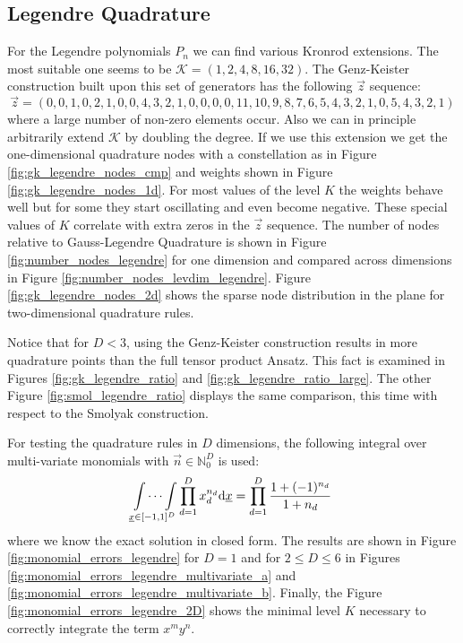 \documentclass[a4paper,10pt]{article}
\begin{document}

\subsection{Legendre Quadrature}

For the Legendre polynomials $P_n$ we can find various Kronrod extensions. The
most suitable one seems to be $\mathcal{K} = (1,2,4,8,16,32)$. The Genz-Keister
construction built upon this set of generators has the following $\vec{z}$
sequence:
\begin{equation*}
  \vec{z} = (0, 0, 1, 0, 2, 1, 0, 0, 4, 3, 2, 1, 0, 0, 0, 0, 11, 10, 9, 8, 7, 6, 5, 4, 3, 2, 1, 0, 5, 4, 3, 2, 1)
\end{equation*}
where a large number of non-zero elements occur. Also we can in principle
arbitrarily extend $\mathcal{K}$ by doubling the degree. If we use this
extension we get the one-dimensional quadrature nodes with a constellation
as in Figure \ref{fig:gk_legendre_nodes_cmp} and weights shown in Figure
\ref{fig:gk_legendre_nodes_1d}. For most values of the level $K$ the weights
behave well but for some they start oscillating and even become negative.
These special values of $K$ correlate with extra zeros in the $\vec{z}$ sequence.
The number of nodes relative to Gauss-Legendre Quadrature is shown
in Figure \ref{fig:number_nodes_legendre} for one dimension and
compared across dimensions in Figure \ref{fig:number_nodes_levdim_legendre}.
Figure \ref{fig:gk_legendre_nodes_2d} shows the sparse node distribution
in the plane for two-dimensional quadrature rules.

Notice that for $D < 3$, using the Genz-Keister construction results
in more quadrature points than the full tensor product Ansatz. This
fact is examined in Figures \ref{fig:gk_legendre_ratio} and \ref{fig:gk_legendre_ratio_large}.
The other Figure \ref{fig:smol_legendre_ratio} displays the same comparison,
this time with respect to the Smolyak construction.

For testing the quadrature rules in $D$ dimensions, the following integral
over multi-variate monomials with $\vec{n} \in \mathbb{N}_0^D$ is used:
\begin{equation} \label{eq:legendre_exact_solution}
  \idotsint \limits_{\underline{x} \in [-1,1]^D} \prod_{d=1}^D x_d^{n_d} \mathrm{d}\underline{x}
  =
  \prod_{d=1}^D \frac{1 + (-1)^{n_d}}{1 + n_d}
\end{equation}
where we know the exact solution in closed form. The results are shown in
Figure \ref{fig:monomial_errors_legendre} for $D=1$ and for $2 \leq D \leq 6$
in Figures \ref{fig:monomial_errors_legendre_multivariate_a} and
\ref{fig:monomial_errors_legendre_multivariate_b}.
Finally, the Figure \ref{fig:monomial_errors_legendre_2D} shows the minimal
level $K$ necessary to correctly integrate the term $x^m y^n$.
\end{document}

